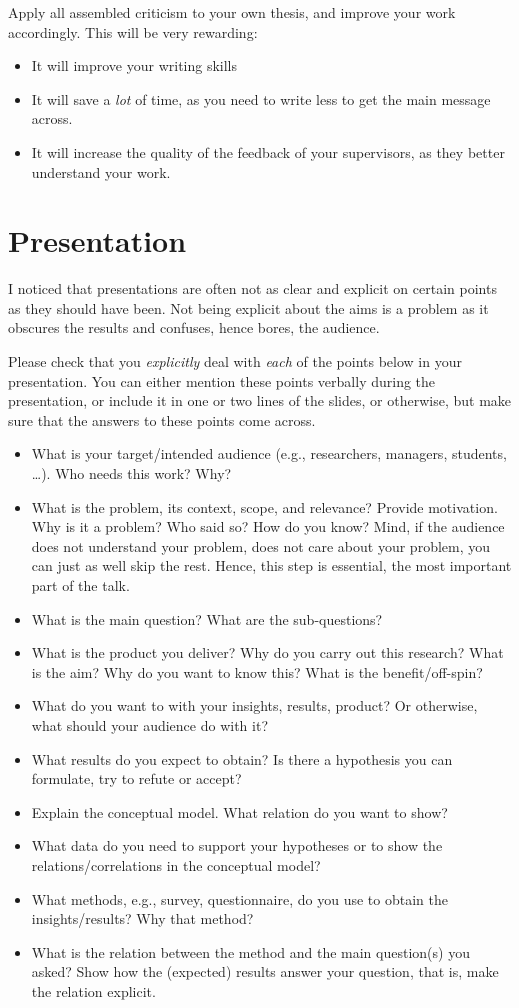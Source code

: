 \documentclass{article}
\begin{document}
Apply all assembled criticism to your own thesis, and improve your
work accordingly. This will be very rewarding:
\begin{itemize}
\item It will improve your writing skills
\item It will save a \textit{lot} of time, as you need to write less
  to get the main message across.
\item It will increase the quality of the feedback of your
  supervisors, as they better understand your work.
\end{itemize}

\section{Presentation}
\label{sec:old-stuff}

I noticed that presentations are often not as clear and explicit on
certain points as they should have been. Not being explicit about the
aims is a problem as it obscures the results and confuses, hence
bores, the audience. 

Please check that you \textit{explicitly} deal with \textit{each} of
the points below in your presentation.  You can either mention these
points verbally during the presentation, or include it in one or two
lines of the slides, or otherwise, but make sure that the answers to
these points come across.

\begin{itemize}
\item What is your target/intended audience (e.g., researchers,
  managers, students, \ldots). Who needs this work? Why?
\item What is the problem, its context, scope, and relevance?  Provide
  motivation. Why is it a problem? Who said so? How do you know? Mind,
  if the audience does not understand your problem, does not care
  about your problem, you can just as well skip the rest. Hence, this
  step is essential, the most important part of the talk.
\item What is the main question? What are the sub-questions? 
\item What is the product you deliver?  Why do you carry out this
  research? What is the aim? Why do you want to know this? What is the
  benefit/off-spin?
\item What do you want to with your insights, results, product? Or otherwise,
  what should your audience do with it?
\item What results do you expect to obtain? Is there a hypothesis you
  can formulate, try to refute or accept?
\item Explain the conceptual model. What relation do you want to show?
\item What data do you need to support your hypotheses or to show the
  relations/correlations in the conceptual model?
\item What methods, e.g., survey, questionnaire, do you use to obtain
  the insights/results? Why that method?
\item What is the relation between the method and the main question(s)
  you asked? Show how the (expected) results answer your question,
  that is, make the relation explicit.
\end{itemize}
\end{document}
